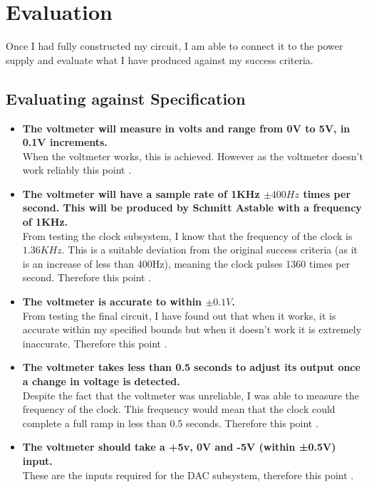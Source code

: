 \chapter{Evaluation}
Once I had fully constructed my circuit, I am able to connect it to the power supply and evaluate what I have produced against my success criteria.
\section{Evaluating against Specification}
\begin{itemize}
    \item \textbf{The voltmeter will measure in volts and range from 0V to 5V, in 0.1V increments.}\\ When the voltmeter works, this is achieved. However as the voltmeter doesn't work reliably this point .
    \item \textbf{The voltmeter will have a sample rate of 1KHz $\pm 400Hz$ times per second. This will be produced by Schmitt Astable with a frequency of 1KHz.}\\ From testing the clock subsystem, I know that the frequency of the clock is $1.36KHz$. This is a suitable deviation from the original success criteria (as it is an increase of less than 400Hz), meaning the clock pulses 1360 times per second. Therefore this point .
    \item \textbf{The voltmeter is accurate to within $\pm0.1V$.}\\ From testing the final circuit, I have found out that when it works, it is accurate within my specified bounds but when it doesn't work it is extremely inaccurate. Therefore this point .
    \item \textbf{The voltmeter takes less than 0.5 seconds to adjust its output once a change in voltage is detected.}\\ Despite the fact that the voltmeter was unreliable, I was able to measure the frequency of the clock. This frequency would mean that the clock could complete a full ramp in less than 0.5 seconds. Therefore this point .
    \item \textbf{The voltmeter should take a +5v, 0V and -5V (within ±0.5V) input.}\\ These are the inputs required for the DAC subsystem, therefore this point .

\end{itemize}
